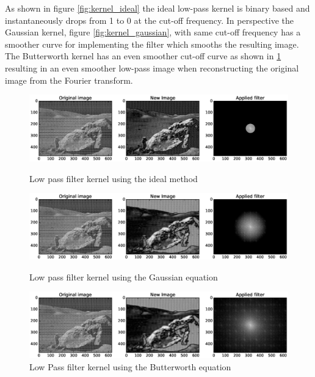 As shown in figure \ref{fig:kernel_ideal} the ideal low-pass kernel is binary
based and instantaneously drops from 1 to 0 at the cut-off frequency.  In
perspective the Gaussian kernel, figure \ref{fig:kernel_gaussian}, with same
cut-off frequency has a smoother curve for implementing the filter which smooths
the resulting image.  The Butterworth kernel has an even smoother cut-off curve
as shown in \ref{fig:kernel_btw} resulting in an even smoother low-pass image
when reconstructing the original image from the Fourier transform.

\begin{figure}[h]
\begin{minipage}{0.33\linewidth}
	\centering
	\includegraphics[width=1\linewidth,clip,trim={650 110 75 110}]{pics/moon_lp_ideal}
	\caption{Low pass filter kernel using the ideal method}
	\label{fig:kernel_ideal}
\end{minipage}\hfill
\begin{minipage}{0.33\linewidth}
	\centering
	\includegraphics[width=1\linewidth,clip,trim={650 110 75 110}]{pics/moon_lp_gaussian}
	\caption{Low pass filter kernel using the Gaussian equation}
	\label{fig:kernel_gaussian}
\end{minipage}\hfill
\begin{minipage}{0.33\linewidth}
	\centering
	\includegraphics[width=1\linewidth,clip,trim={650 110 75 110}]{pics/moon_lp_btw}
	\caption{Low Pass filter kernel using the Butterworth equation}
	\label{fig:kernel_btw}
\end{minipage}
\end{figure}


